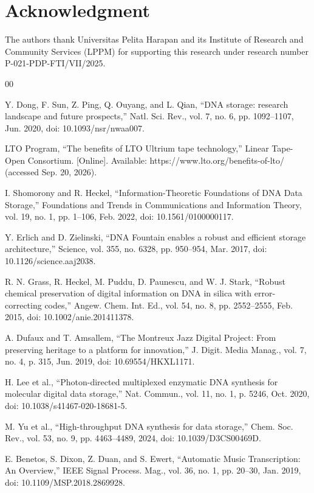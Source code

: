 \documentclass[conference]{IEEEtran}
\begin{document}
\section*{Acknowledgment}

The authors thank Universitas Pelita Harapan and its Institute of Research and Community Services (LPPM) for supporting this research under research number P-021-PDP-FTI/VII/2025.

\begin{thebibliography}{00}

 Y. Dong, F. Sun, Z. Ping, Q. Ouyang, and L. Qian, ``DNA storage: research landscape and future prospects,'' Natl. Sci. Rev., vol. 7, no. 6, pp. 1092--1107, Jun. 2020, doi: 10.1093/nsr/nwaa007.

 LTO Program, ``The benefits of LTO Ultrium tape technology,'' Linear Tape-Open Consortium. [Online]. Available: https://www.lto.org/benefits-of-lto/ (accessed Sep. 20, 2026).

 I. Shomorony and R. Heckel, ``Information-Theoretic Foundations of DNA Data Storage,'' Foundations and Trends in Communications and Information Theory, vol. 19, no. 1, pp. 1--106, Feb. 2022, doi: 10.1561/0100000117.

 Y. Erlich and D. Zielinski, ``DNA Fountain enables a robust and efficient storage architecture,'' Science, vol. 355, no. 6328, pp. 950--954, Mar. 2017, doi: 10.1126/science.aaj2038.

 R. N. Grass, R. Heckel, M. Puddu, D. Paunescu, and W. J. Stark, ``Robust chemical preservation of digital information on DNA in silica with error-correcting codes,'' Angew. Chem. Int. Ed., vol. 54, no. 8, pp. 2552--2555, Feb. 2015, doi: 10.1002/anie.201411378.

 A. Dufaux and T. Amsallem, ``The Montreux Jazz Digital Project: From preserving heritage to a platform for innovation,'' J. Digit. Media Manag., vol. 7, no. 4, p. 315, Jun. 2019, doi: 10.69554/HKXL1171.

 H. Lee et al., ``Photon-directed multiplexed enzymatic DNA synthesis for molecular digital data storage,'' Nat. Commun., vol. 11, no. 1, p. 5246, Oct. 2020, doi: 10.1038/s41467-020-18681-5.

 M. Yu et al., ``High-throughput DNA synthesis for data storage,'' Chem. Soc. Rev., vol. 53, no. 9, pp. 4463--4489, 2024, doi: 10.1039/D3CS00469D.

 E. Benetos, S. Dixon, Z. Duan, and S. Ewert, ``Automatic Music Transcription: An Overview,'' IEEE Signal Process. Mag., vol. 36, no. 1, pp. 20--30, Jan. 2019, doi: 10.1109/MSP.2018.2869928.


\end{thebibliography}
\end{document}

